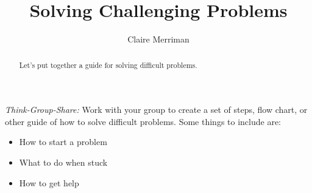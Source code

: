 \documentclass[handout,nooutcomes,noauthor,hints]{ximera}
\title{Solving Challenging Problems}
\author{Claire Merriman}
\begin{document}
\begin{abstract}
  Let's put together a guide for solving difficult problems.
\end{abstract}
\maketitle
\emph{Think-Group-Share:} Work with your group to create a set of steps, flow chart, or other guide of how to solve difficult problems. Some things to include are:
\begin{itemize}
 \item How to start a problem
 \item What to do when stuck
 \item How to get help
\end{itemize}
\mynewpage
\end{document}
